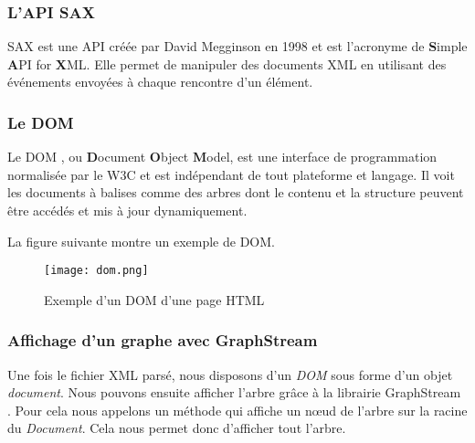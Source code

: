 \subsubsection{L'API SAX}

SAX \cite{sax_website, sax_oracle} est une API créée par David Megginson en 1998 et est l'acronyme de \textbf{S}imple \textbf{A}PI for \textbf{X}ML. Elle permet de manipuler des documents XML en utilisant des événements envoyées à chaque rencontre d'un élément.


\subsubsection{Le DOM}

Le DOM \cite{dom_w3c} , ou \textbf{D}ocument \textbf{O}bject \textbf{M}odel, est une interface de programmation normalisée par le W3C et est indépendant de tout plateforme et langage. Il voit les documents à balises comme des arbres dont le contenu et la structure peuvent être accédés et mis à jour dynamiquement.

\par
La figure suivante montre un exemple de DOM.

\begin{figure}[!h]
\centering
\texttt{[image: dom.png]}\\[1cm]
\caption{Exemple d'un DOM d'une page HTML}
\end{figure}


\subsubsection{Affichage d'un graphe avec GraphStream}

Une fois le fichier XML parsé, nous disposons d'un \emph{DOM} sous forme d'un objet \emph{document}. Nous pouvons ensuite afficher l'arbre grâce à la librairie GraphStream \cite{graphstream}. Pour cela nous appelons un méthode qui affiche un nœud de l'arbre sur la racine du \emph{Document}. Cela nous permet donc d'afficher tout l'arbre.
